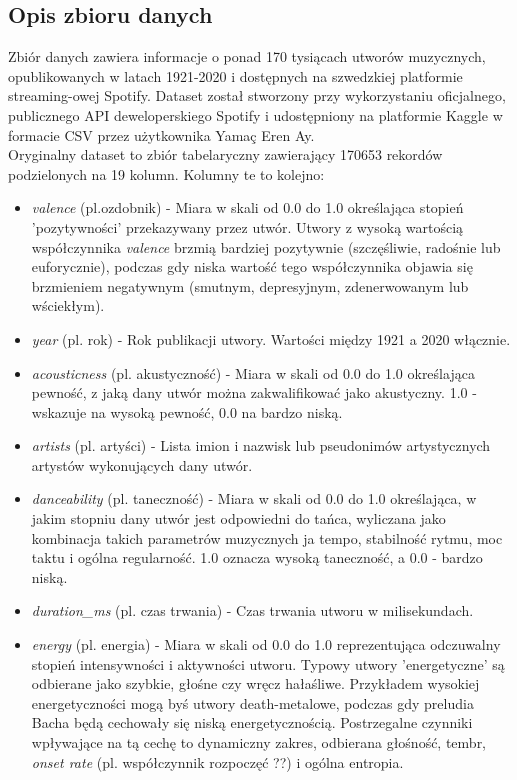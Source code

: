 \documentclass[a4paper,11pt]{article}
\begin{document}
    \subsection{Opis zbioru danych}
    Zbiór danych zawiera informacje o ponad 170 tysiącach utworów muzycznych, opublikowanych w latach 1921-2020 i dostępnych na szwedzkiej platformie streaming-owej Spotify. Dataset został stworzony przy wykorzystaniu oficjalnego, publicznego API deweloperskiego Spotify i udostępniony na platformie Kaggle w formacie CSV przez użytkownika Yamaç Eren Ay.
    \bigskip
    \\ Oryginalny dataset to zbiór tabelaryczny zawierający 170653 rekordów podzielonych na 19 kolumn. Kolumny te to kolejno:
    \begin{itemize}
        \item \textit{valence} (pl.ozdobnik) - Miara w skali od 0.0 do 1.0 określająca stopień 'pozytywności' przekazywany przez utwór. Utwory z wysoką wartością współczynnika \textit{valence} brzmią bardziej pozytywnie (szczęśliwie, radośnie lub euforycznie), podczas gdy niska wartość tego współczynnika objawia się brzmieniem negatywnym (smutnym, depresyjnym, zdenerwowanym lub wściekłym).
        \item \textit{year} (pl. rok) - Rok publikacji utwory. Wartości między 1921 a 2020 włącznie.
        \item \textit{acousticness} (pl. akustyczność) - Miara w skali od 0.0 do 1.0 określająca pewność, z jaką dany utwór można zakwalifikować jako akustyczny. 1.0 - wskazuje na wysoką pewność, 0.0 na bardzo niską.
        \item \textit{artists} (pl. artyści) - Lista imion i nazwisk lub pseudonimów artystycznych artystów wykonujących dany utwór.
        \item \textit{danceability} (pl. taneczność) - Miara w skali od 0.0 do 1.0 określająca, w jakim stopniu dany utwór jest odpowiedni do tańca, wyliczana jako kombinacja takich parametrów muzycznych ja tempo, stabilność rytmu, moc taktu i ogólna regularność. 1.0 oznacza wysoką taneczność, a 0.0 - bardzo niską.
        \item \textit{duration\_ms} (pl. czas trwania) - Czas trwania utworu w milisekundach.
        \item \textit{energy} (pl. energia) - Miara w skali od 0.0 do 1.0 reprezentująca odczuwalny stopień intensywności i aktywności utworu. Typowy utwory 'energetyczne' są odbierane jako szybkie, głośne czy wręcz hałaśliwe. Przykładem wysokiej energetyczności mogą byś utwory death-metalowe, podczas gdy preludia Bacha będą cechowały się niską energetycznością. Postrzegalne czynniki wpływające na tą cechę to dynamiczny zakres, odbierana głośność, tembr, \textit{onset rate} (pl. współczynnik rozpoczęć ??) i ogólna entropia.

\end{itemize}
\end{document}
